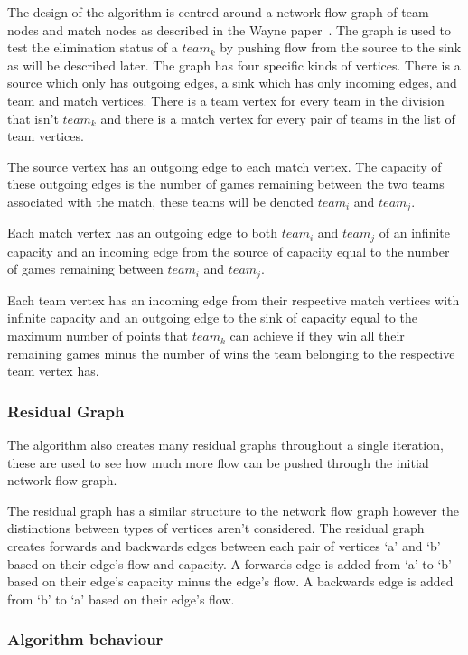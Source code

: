The design of the algorithm is centred around a network flow graph of
team nodes and match nodes as described in the Wayne
paper~\cite{Wayne}. The graph is used to test the elimination status of a
$team_k$ by pushing flow from the source to the sink as will be described 
later. The graph has four specific kinds of vertices. There is a source
which only has outgoing edges, a sink which has only incoming edges, and
team and match vertices. There is a team vertex for every team in the
division that isn't $team_k$ and there is a match vertex for every pair
of teams in the list of team vertices.

The source vertex has an outgoing edge to each match vertex.
The capacity of these outgoing edges is the number of games remaining between
the two teams associated with the match, these teams will be denoted
$team_i$ and $team_j$.

Each match vertex has an outgoing edge to both $team_i$ and $team_j$ of an 
infinite capacity and an incoming edge from the source of capacity equal to the 
number of games remaining between $team_i$ and $team_j$.

Each team vertex has an incoming edge from their respective match vertices with
infinite capacity and an outgoing edge to the sink of capacity equal to the 
maximum number of points that $team_k$ can achieve if they win all their 
remaining games minus the number of wins the team belonging to the respective 
team vertex has. 

\subsubsection{Residual Graph}

The algorithm also creates many residual graphs throughout a single iteration,
these are used to see how much more flow can be pushed through the initial
network flow graph.

The residual graph has a similar structure to the network flow graph however
the distinctions between types of vertices aren't considered. The residual
graph creates forwards and backwards edges between each pair of vertices `a'
and `b' based on their edge's flow and capacity. A forwards edge is added from
`a' to `b' based on their edge's capacity minus the edge's flow. A backwards 
edge is added from `b' to `a' based on their edge's flow.


\subsubsection{Algorithm behaviour}

